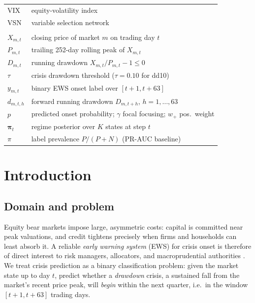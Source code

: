 \documentclass[11pt,a4paper]{article}
\begin{document}
\begin{tabular}{@{}ll@{}}
VIX & equity-volatility index \\
VSN & variable selection network \\
\addlinespace
\multicolumn{2}{@{}l}{\emph{Notation}}\\
\midrule
$X_{m,t}$ & closing price of market $m$ on trading day $t$ \\
$P_{m,t}$ & trailing 252-day rolling peak of $X_{m,t}$ \\
$D_{m,t}$ & running drawdown $X_{m,t}/P_{m,t}-1\le 0$ \\
$\tau$ & crisis drawdown threshold ($\tau=0.10$ for dd10) \\
$y_{m,t}$ & binary EWS onset label over $[t{+}1,t{+}63]$ \\
$d_{m,t,h}$ & forward running drawdown $D_{m,t+h}$, $h=1,\dots,63$ \\
$p$ & predicted onset probability; $\gamma$ focal focusing; $w_{+}$ pos.\ weight \\
$\boldsymbol\pi_t$ & regime posterior over $K$ states at step $t$ \\
$\pi$ & label prevalence $P/(P{+}N)$ (PR-AUC baseline) \\
\bottomrule
\end{tabular}

\clearpage
\section{Introduction}
\label{sec:intro}

\subsection{Domain and problem}
Equity bear markets impose large, asymmetric costs: capital is committed near
peak valuations, and credit tightens precisely when firms and households can
least absorb it. A reliable \emph{early warning system} (EWS) for crisis
onset is therefore of direct interest to risk managers, allocators, and
macroprudential authorities \citep{kaminsky1999leading,reinhartrogoff2009}.
We treat crisis prediction as a binary classification problem: given the
market state up to day $t$, predict whether a \emph{drawdown} crisis, a
sustained fall from the market's recent price peak, will \emph{begin} within
the next quarter, i.e.\ in the window $[t+1,t+63]$ trading days.
\end{document}

